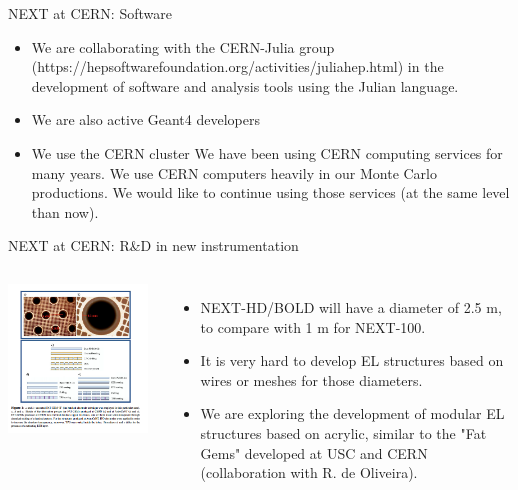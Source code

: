 \documentclass [aspectratio=169]{beamer}
\begin{document}
\begin{frame}{NEXT at CERN: Software}

\begin{itemize}
\item We are collaborating with the CERN-Julia group (https://hepsoftwarefoundation.org/activities/juliahep.html) in the development of software and analysis tools using the Julian language. 
\item We are also active Geant4 developers 
\item We use the CERN cluster 
We have been using CERN computing services for many years. We use CERN computers heavily in our Monte Carlo productions. We would like to continue using those services (at the same level than now). 
\end{itemize}

\end{frame}
\begin{frame}{NEXT at CERN: R\&D in new instrumentation}


\begin{columns}

\includegraphics[width=0.95\textwidth]{fatGem.png}


\begin{itemize}
\item NEXT-HD/BOLD will have a diameter of 2.5 m, to compare with 1 m for NEXT-100. 
\item It is very hard to develop EL structures based on wires or meshes for those diameters. 
\item We are exploring the development of modular EL structures based on acrylic, similar to the "Fat Gems" developed at USC and CERN (collaboration with R. de Oliveira).
\end{itemize}
\end{columns}
\end{frame}
\end{document}
